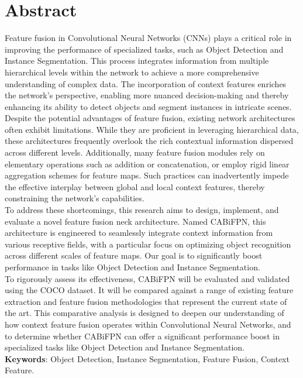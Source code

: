 \chapter{Abstract}
Feature fusion in Convolutional Neural Networks (CNNs) plays a critical role in improving the performance of specialized tasks, such as Object Detection and Instance Segmentation. This process integrates information from multiple hierarchical levels within the network to achieve a more comprehensive understanding of complex data. The incorporation of context features enriches the network's perspective, enabling more nuanced decision-making and thereby enhancing its ability to detect objects and segment instances in intricate scenes.\\

Despite the potential advantages of feature fusion, existing network architectures often exhibit limitations. While they are proficient in leveraging hierarchical data, these architectures frequently overlook the rich contextual information dispersed across different levels. Additionally, many feature fusion modules rely on elementary operations such as addition or concatenation, or employ rigid linear aggregation schemes for feature maps. Such practices can inadvertently impede the effective interplay between global and local context features, thereby constraining the network's capabilities.\\

To address these shortcomings, this research aims to design, implement, and evaluate a novel feature fusion neck architecture. Named CABiFPN, this architecture is engineered to seamlessly integrate context information from various receptive fields, with a particular focus on optimizing object recognition across different scales of feature maps. Our goal is to significantly boost performance in tasks like Object Detection and Instance Segmentation.\\

To rigorously assess its effectiveness, CABiFPN will be evaluated and validated using the COCO dataset. It will be compared against a range of existing feature extraction and feature fusion methodologies that represent the current state of the art.
This comparative analysis is designed to deepen our understanding of how context feature fusion operates within Convolutional Neural Networks, and to determine whether CABiFPN can offer a significant performance boost in specialized tasks like Object Detection and Instance Segmentation.\\

\textbf{Keywords}: Object Detection, Instance Segmentation, Feature Fusion, Context Feature.